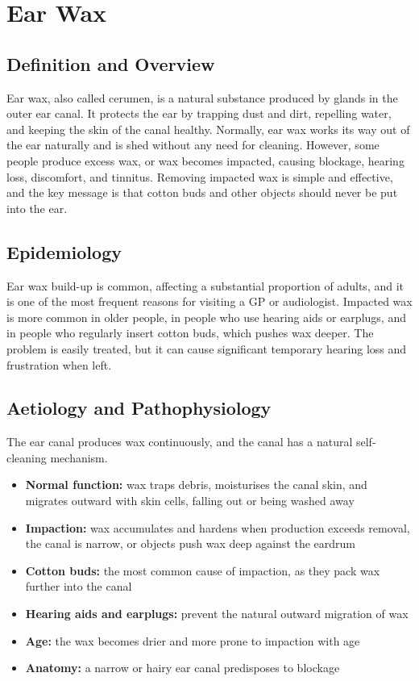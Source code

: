 \chapter{Ear Wax}

\section*{Definition and Overview}
Ear wax, also called cerumen, is a natural substance produced by glands in the outer ear canal. It protects the ear by trapping dust and dirt, repelling water, and keeping the skin of the canal healthy. Normally, ear wax works its way out of the ear naturally and is shed without any need for cleaning. However, some people produce excess wax, or wax becomes impacted, causing blockage, hearing loss, discomfort, and tinnitus. Removing impacted wax is simple and effective, and the key message is that cotton buds and other objects should never be put into the ear.

\section*{Epidemiology}
Ear wax build-up is common, affecting a substantial proportion of adults, and it is one of the most frequent reasons for visiting a GP or audiologist. Impacted wax is more common in older people, in people who use hearing aids or earplugs, and in people who regularly insert cotton buds, which pushes wax deeper. The problem is easily treated, but it can cause significant temporary hearing loss and frustration when left.

\section*{Aetiology and Pathophysiology}
The ear canal produces wax continuously, and the canal has a natural self-cleaning mechanism.
\begin{itemize}
    \item \textbf{Normal function:} wax traps debris, moisturises the canal skin, and migrates outward with skin cells, falling out or being washed away
    \item \textbf{Impaction:} wax accumulates and hardens when production exceeds removal, the canal is narrow, or objects push wax deep against the eardrum
    \item \textbf{Cotton buds:} the most common cause of impaction, as they pack wax further into the canal
    \item \textbf{Hearing aids and earplugs:} prevent the natural outward migration of wax
    \item \textbf{Age:} the wax becomes drier and more prone to impaction with age
    \item \textbf{Anatomy:} a narrow or hairy ear canal predisposes to blockage
\end{itemize}

